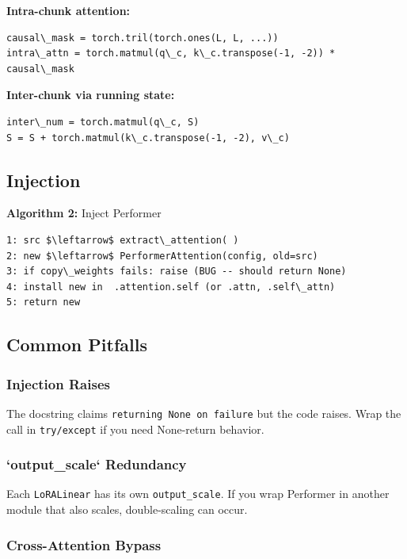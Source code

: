 \textbf{Intra-chunk attention:}

\begin{lstlisting}
causal\_mask = torch.tril(torch.ones(L, L, ...))
intra\_attn = torch.matmul(q\_c, k\_c.transpose(-1, -2)) * causal\_mask
\end{lstlisting}

\textbf{Inter-chunk via running state:}

\begin{lstlisting}
inter\_num = torch.matmul(q\_c, S)
S = S + torch.matmul(k\_c.transpose(-1, -2), v\_c)
\end{lstlisting}

\subsection{Injection}

\textbf{Algorithm 2:} Inject Performer
\begin{lstlisting}
1: src $\leftarrow$ extract\_attention( )
2: new $\leftarrow$ PerformerAttention(config, old=src)
3: if copy\_weights fails: raise (BUG -- should return None)
4: install new in  .attention.self (or .attn, .self\_attn)
5: return new
\end{lstlisting}

\subsection{Common Pitfalls}

\subsubsection{Injection Raises}

The docstring claims \texttt{returning None on failure} but the code raises. 
Wrap the call in \texttt{try/except} if you need None-return behavior.

\subsubsection{`output\_scale` Redundancy}

Each \texttt{LoRALinear} has its own \texttt{output\_scale}. If you wrap Performer in 
another module that also scales, double-scaling can occur.

\subsubsection{Cross-Attention Bypass}

